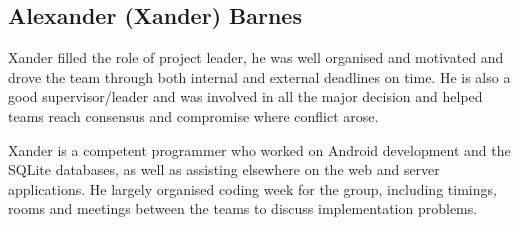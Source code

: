 \subsection{Alexander (Xander) Barnes}
	Xander filled the role of project leader, he was well organised and motivated and drove the team through both internal and external deadlines on time. He is also a good supervisor/leader and was involved in all the major decision and helped teams reach consensus and compromise where conflict arose.

	Xander is a competent programmer who worked on Android development and the SQLite databases, as well as assisting elsewhere on the web and server applications. He largely organised coding week for the group, including timings, rooms and meetings between the teams to discuss implementation problems. 